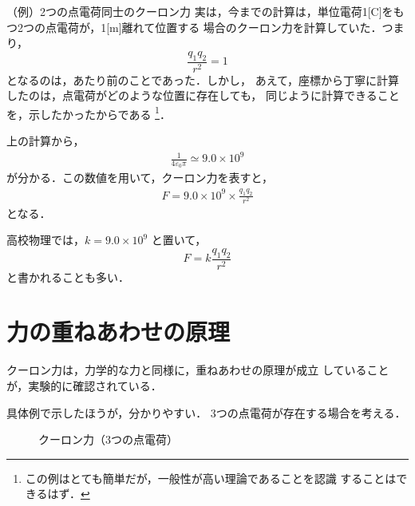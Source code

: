 \begin{memo}{（例）2つの点電荷同士のクーロン力}
    実は，今までの計算は，単位電荷1[C]をもつ2つの点電荷が，1[m]離れて位置する
    場合のクーロン力を計算していた．つまり，
        \begin{equation*}
            \frac{q_{1}q_{2}}{r^{2}} = 1
        \end{equation*}
    となるのは，あたり前のことであった．しかし，
    あえて，座標から丁寧に計算したのは，点電荷がどのような位置に存在しても，
    同じように計算できることを，示したかったからである
        \footnote{
            この例はとても簡単だが，一般性が高い理論であることを認識
            することはできるはず．
        }．

    上の計算から，
        \begin{align}
            \frac{1}{4\varepsilon_{0} \pi} \simeq 9.0 \times 10^{9}
        \end{align}
    が分かる．この数値を用いて，クーロン力を表すと，
        \begin{align}
            F = 9.0 \times 10^{9} \times \frac{q_{1}q_{2}}{r^{2}}
        \end{align}
    となる．

    高校物理では，$k=9.0 \times 10^{9}$ と置いて，
        \begin{equation*}
            F = k \frac{q_{1}q_{2}}{r^{2}}
        \end{equation*}
    と書かれることも多い．
\end{memo}

    \section{力の重ねあわせの原理}
        クーロン力は，力学的な力と同様に，重ねあわせの原理が成立
        していることが，実験的に確認されている．

        具体例で示したほうが，分かりやすい．
        3つの点電荷が存在する場合を考える．
        \begin{figure}[hbt]
            \begin{center}
                \caption{クーロン力（3つの点電荷）}
                \label{fig:EM_Coulomb_KasaneAwase00}
            \end{center}
        \end{figure}

